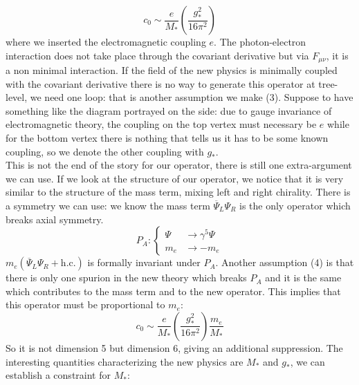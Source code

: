 \documentclass[../main.tex]{subfiles}
\begin{document}
\begin{example}
\[
c_0\sim\frac{e}{M_*}\left(\frac{g_*^2}{16\pi^2}\right)
\]
where we inserted the electromagnetic coupling $e$. The photon-electron interaction does not take place through the covariant derivative but via $F_{\mu\nu}$, it is a non minimal interaction. If the field of the new physics is minimally coupled with the covariant derivative there is no way to generate this operator at tree-level, we need one loop: that is another assumption we make (3). Suppose to have something like the diagram portrayed on the side: due to gauge invariance of electromagnetic theory, the coupling on the top vertex must necessary be $e$ while for the bottom vertex there is nothing that tells us it has to be some known coupling, so we denote the other coupling with $g_*$.\\
This is not the end of the story for our operator, there is still one extra-argument we can use. If we look at the structure of our operator, we notice that it is very similar to the structure of the mass term, mixing left and right chirality. There is a symmetry we can use: we know the mass term $\overline{\Psi}_L\Psi_R$ is the only operator which breaks axial symmetry.
\[
P_A:
\left\{
\begin{aligned}
\Psi&\to\gamma^5\Psi\\
m_e&\to-m_e
\end{aligned}
\right.
\]
$m_e(\overline{\Psi}_L\Psi_R+\text{h.c.})$ is formally invariant under $P_A$. Another assumption (4) is that there is only one spurion in the new theory which breaks $P_A$ and it is the same which contributes to the mass term and to the new operator. This implies that this operator must be proportional to $m_e$:
\[
c_0\sim\frac{e}{M_*}\left(\frac{g_*^2}{16\pi^2}\right)\frac{m_e}{M_*}
\]
So it is not dimension 5 but dimension 6, giving an additional suppression. The interesting quantities characterizing the new physics are $M_*$ and $g_*$, we can establish a constraint for $M_*$:

\end{example}
\end{document}

